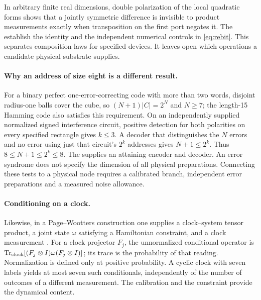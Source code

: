 In arbitrary finite real dimensions, double polarization of the local quadratic forms shows that a jointly symmetric difference is invisible to product measurements exactly when transposition on the first port negates it. The  establish the identity and the independent numerical controls in \eqref{eq:rebit}. This separates composition laws for specified devices. It leaves open which operations a candidate physical substrate supplies.

\paragraph{Why an address of size eight is a different result.}
For a binary perfect one-error-correcting code with more than two words, disjoint radius-one balls cover the cube, so $(N+1)|C|=2^N$ and $N\ge7$; the length-15 Hamming code also satisfies this requirement. On an independently supplied normalized signed interference circuit, positive detection for both polarities on every specified rectangle gives $k\le3$. A decoder that distinguishes the $N$ errors and no error using just that circuit's $2^k$ addresses gives $N+1\le2^k$. Thus $8\le N+1\le2^k\le8$. The  supplies an attaining encoder and decoder. An error syndrome does not specify the dimension of all physical preparations. Connecting these tests to a physical node requires a calibrated branch, independent error preparations and a measured noise allowance.

\paragraph{Conditioning on a clock.}
Likewise, in a Page--Wootters construction one supplies a clock--system tensor product, a joint state $\omega$ satisfying a Hamiltonian constraint, and a clock measurement \citep{page1983}. For a clock projector $F_j$, the unnormalized conditional operator is $\operatorname{Tr}_{\rm clock}[(F_j\otimes I)\omega(F_j\otimes I)]$; its trace is the probability of that reading. Normalization is defined only at positive probability. A cyclic clock with seven labels yields at most seven such conditionals, independently of the number of outcomes of a different measurement. The calibration and the constraint provide the dynamical content.
